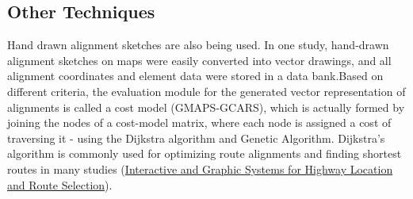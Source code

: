 \subsection{Other Techniques }
Hand drawn alignment sketches are also being used. In one study, hand-drawn alignment sketches on maps were easily converted into vector drawings, and all alignment coordinates and element data were stored in a data bank.Based on different criteria, the evaluation module for the generated vector representation of alignments is called a cost model (GMAPS-GCARS), which is actually formed by joining the nodes of a cost-model matrix, where each node is assigned a cost of traversing it - using the Dijkstra algorithm and Genetic Algorithm. Dijkstra's algorithm is commonly used for optimizing route alignments and finding shortest routes in many studies (\href{https://ascelibrary.org/doi/10.1061/40630%28255%29172 }{Interactive and Graphic Systems for Highway Location and Route Selection}).
